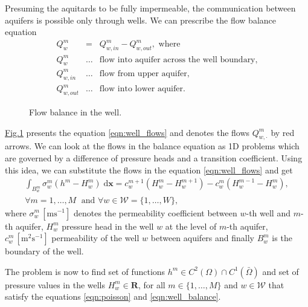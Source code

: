 \documentclass[preprint,12pt,authoryear]{elsarticle}
\newcommand{\fig}[1]{\hyperref[#1]{Fig.\ref{#1}}}
\newcommand{\figpath}{../graphics/}
\newcommand{\dd}{\; \mathrm{d}}
\newcommand{\R}{\mathbf{R}}
\newcommand{\bx}{\mathbf{x}}
\begin{document}
Presuming the aquitards to be fully impermeable, the communication between aquifers is possible only through 
wells. We can prescribe the flow balance equation 
\begin{eqnarray}
  Q^m_w &=& Q^m_{w,in} - Q^m_{w,out}, \textrm{ where} \label{eqn:well_flows} \\
  Q^m_w &\ldots& \textrm{flow into aquifer across the well boundary,} \nonumber\\
  Q^m_{w,in} &\ldots& \textrm{flow from upper aquifer,} \nonumber\\
  Q^m_{w,out} &\ldots& \textrm{flow into lower aquifer.} \nonumber
\end{eqnarray}
\begin{figure}[!htb]
  \begin{center}         
    \def\svgwidth{0.5\textwidth}
    
  \end{center}
  \caption{Flow balance in the well.}
  \label{fig:well_flows}
\end{figure}

\fig{fig:well_flows} presents the equation \eqref{eqn:well_flows} and denotes the flows $Q^m_{w,\cdot}$ by red arrows.
We can look at the flows in the balance equation as 1D problems which are governed by a difference of pressure
heads and a transition coefficient. Using this idea, we can substitute the flows in the equation 
\eqref{eqn:well_flows} and get
\begin{eqnarray} 
\int_{B_w^m}\sigma_w^m \left(h^m - H_w^m\right) \dd\bx 
  = c_w^{m+1}\left( H^m_w-H_w^{m+1}\right) - c^m_w\left( H^{m-1}_w-H^m_w \right), \label{eqn:well_balance} \\
 \forall m=1,\dots,M \;\textrm{ and } \forall w\in\mathcal{W}=\{1,\dots,W\}, \nonumber
\end{eqnarray}
where $\sigma^m_w\, [\textrm{m}\textrm{s}^{-1}]$ denotes the permeability coefficient between $w$-th well and $m$-th aquifer, 
$H_w^m$ pressure head in the well $w$ at the level of $m$-th aquifer, $c^m_w\, [\textrm{m}^2\textrm{s}^{-1}]$ 
permeability of the well $w$ between aquifers and finally $B^m_w$ is the boundary of the well.

The problem is now to find set of functions $h^m\in C^2(\Omega)\cap{C}^1(\bar\Omega)$ and set of pressure 
values in the wells $H^m_w\in\R$, for all $m\in\{1,\ldots,M\}$ and $w\in\mathcal{W}$ that
satisfy the equations \eqref{eqn:poisson} and \eqref{eqn:well_balance}.
\end{document}

